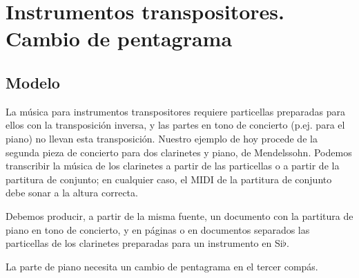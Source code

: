 \section{Instrumentos transpositores. Cambio de pentagrama}


\subsection{Modelo}

La música para instrumentos transpositores requiere particellas
preparadas para ellos con la transposición inversa, y las partes en
tono de concierto (p.ej. para el piano) no llevan esta transposición.
Nuestro ejemplo de hoy procede de la segunda pieza de concierto para
dos clarinetes y piano, de Mendelssohn.  Podemos transcribir la música
de los clarinetes a partir de las particellas o a partir de la
partitura de conjunto; en cualquier caso, el MIDI de la partitura de
conjunto debe sonar a la altura correcta.

Debemos producir, a partir de la misma fuente, un documento con la
partitura de piano en tono de concierto, y en páginas o en documentos
separados las particellas de los clarinetes preparadas para un
instrumento en Si$\flat$.

La parte de piano necesita un cambio de pentagrama en el tercer
compás.

